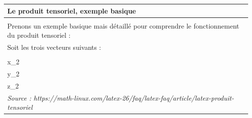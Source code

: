 \documentclass[12pt,a4paper,titlepage]{book}
\begin{document}
\begin{tabular}{|p{15cm}|}
\hline
\textbf{Le produit tensoriel, exemple basique}\\
\hline\\
Prenons un exemple basique mais détaillé pour comprendre le fonctionnement du produit tensoriel : \\

Soit les trois vecteurs suivants :\\

\begin{center}
\[
\mathbf{x} = 
\left[
\begin{matrix}
x_1\\
x_2
\end{matrix}
\right]
, \mathbf{y} =
\left[
\begin{matrix}
y_1\\
y_2
\end{matrix}
\right]
, \mathbf{z} =
\left[
\begin{matrix}
z_1\\
z_2
\end{matrix}
\right]
\]
\end{center}

$$
\mathbf{x} \otimes \mathbf{y} \otimes \mathbf{z}=
\begin{aligned}
\left[\begin{array}{l}
x_{1} \\
x_{2}
\end{array}\right] \otimes\left[\begin{array}{l}
y_{1} \\
y_{2}
\end{array}\right] \otimes\left[\begin{array}{l}
z_{1} \\
z_{2}
\end{array}\right]=\left[\begin{array}{l}
x_{1} \\
x_{2}
\end{array}\right] \otimes\left[\begin{array}{l}
y_{1} z_{1} \\
y_{1} z_{2} \\
y_{2} z_{1} \\
y_{2} z_{2}
\end{array}\right] =\left[\begin{array}{l}
x_{1} y_{1} z_{1} \\
x_{1} y_{1} z_{2} \\
x_{1} y_{2} z_{1} \\
x_{1} y_{2} z_{2} \\
x_{2} y_{1} z_{1} \\
x_{2} y_{1} z_{2} \\
x_{2} y_{2} z_{1} \\
x_{2} y_{2} z_{2}
\end{array}\right]
\end{aligned}
$$\\

\textit{Source : https://math-linux.com/latex-26/faq/latex-faq/article/latex-produit-tensoriel}\\

\hline
\end{tabular}\\
\end{document}
